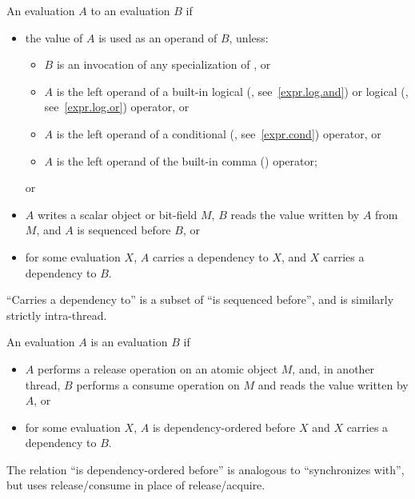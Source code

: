 \pnum
An evaluation $A$  to an evaluation $B$ if
\begin{itemize}
\item
the value of $A$ is used as an operand of $B$, unless:
\begin{itemize}
\item
$B$ is an invocation of any specialization of
, or
\item
$A$ is the left operand of a built-in logical  (\tcode{\&\&},
see~\ref{expr.log.and}) or logical  (\tcode{||}, see~\ref{expr.log.or})
operator, or
\item
$A$ is the left operand of a conditional (, see~\ref{expr.cond})
operator, or
\item
$A$ is the left operand of the built-in comma (\tcode{,})
operator; \end{itemize} or
\item
$A$ writes a scalar object or bit-field $M$, $B$ reads the value
written by $A$ from $M$, and $A$ is sequenced before $B$, or
\item
for some evaluation $X$, $A$ carries a dependency to $X$, and
$X$ carries a dependency to $B$.
\end{itemize}
\begin{note}
``Carries a dependency to'' is a subset of ``is sequenced before'',
and is similarly strictly intra-thread.
\end{note}

\pnum
An evaluation $A$ is  an evaluation
$B$ if
\begin{itemize}
\item
$A$ performs a release operation on an atomic object $M$, and, in
another thread, $B$ performs a consume operation on $M$ and reads
the value written by $A$, or

\item
for some evaluation $X$, $A$ is dependency-ordered before $X$ and
$X$ carries a dependency to $B$.

\end{itemize}
\begin{note}
The relation ``is dependency-ordered before'' is analogous to
``synchronizes with'', but uses release/consume in place of release/acquire.
\end{note}


